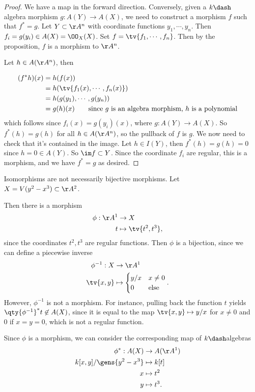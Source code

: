 \begin{proof}

We have a map in the forward direction. Conversely, given a
\(k\dash\)algebra morphism \(g:A(Y) \to A(X)\), we need to construct a
morphism \(f\) such that \(f^* = g\). Let \(Y\subset \AA^n\) with
coordinate functions \(y_1, \cdots, y_n\). Then
\(f_i = g(y_i) \in A(X) = \OO_X(X)\). Set \(f = \tv{f_1, \cdots, f_n}\).
Then by the proposition, \(f\) is a morphism to \(\AA^n\).

Let \(h\in A(\AA^n)\), then

\begin{align*}
(f^*h)(x) 
&= h(f(x)) \\
&= h(\tv{f_1(x) , \cdots, f_n(x)}) \\
&= h(g(y_1), \cdots, g(y_n)) \\ 
&= g(h)(x) \qquad\text{since $g$ is an algebra morphism, $h$ is a polynomial}
\end{align*} which follows since \(f_i(x) = g(y_i)(x)\), where
\(g:A(Y) \to A(X)\). So \(f^*(h) = g(h)\) for all \(h\in A(\AA^n)\), so
the pullback of \(f\) is \(g\). We now need to check that it's contained
in the image. Let \(h\in I(Y)\), then \(f^*(h) = g(h) = 0\) since
\(h = 0 \in A(Y)\). So \(\im f \subset Y\). Since the coordinate \(f_i\)
are regular, this is a morphism, and we have \(f^* = g\) as desired.

\end{proof}

\begin{example}

Isomorphisms are not necessarily bijective morphisms. Let
\(X = V(y^2 - x^3) \subset \AA^2\).

Then there is a morphism
\begin{align*}  
\phi: \AA^1 &\to X \\
t &\mapsto \tv{t^2, t^3}
,\end{align*} since the coordinates \(t^2, t^3\) are regular functions.
Then \(\phi\) is a bijection, since we can define a piecewise inverse
\begin{align*}  
\phi^{-1}: X &\to \AA^1 \\
\tv{x, y} &\mapsto 
\begin{cases}
y/x & x\neq 0 \\
0 & \text{else}
\end{cases}
.\end{align*} However, \(\phi ^{-1}\) is not a morphism. For instance,
pulling back the function \(t\) yields
\(\qty{\phi ^{-1} }^* t \not \in A(X)\), since it is equal to the map
\(\tv{x, y} \mapsto y/x\) for \(x\neq 0\) and \(0\) if \(x=y=0\), which
is not a regular function.

Since \(\phi\) is a morphism, we can consider the corresponding map of
\(k\dash\)algebras
\begin{align*}  
\phi^*: A(X) &\to A(\AA^1) \\
k[x, y]/\gens{y^2 - x^3} &\mapsto k[t] \\
x & \mapsto t^2 \\
y &\mapsto t^3
.\end{align*}

\end{example}

